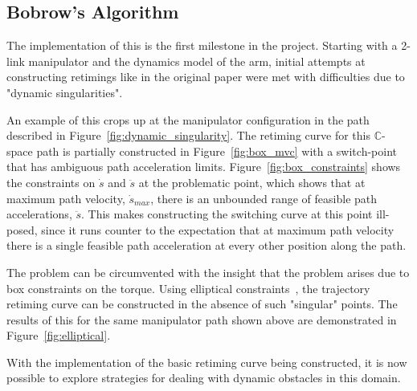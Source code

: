 \documentclass[letterpaper,11pt]{article} %
\newcommand{\ffig}[3]{
\begin{figure}[h!]
\centering
\texttt{[image: \#1]}
\caption{#2}
\label{fig:#3}
\end{figure}
}
\newif\ifpfig
\begin{document}
\subsection{Bobrow's Algorithm}\label{subsec:bobrow}

The implementation of this is the first milestone in the project. Starting with a 2-link manipulator and the dynamics model of the arm, initial attempts at constructing retimings like in the original paper were met with difficulties due to "dynamic singularities".

\ifpfig
\ffig{pics/box_constraint_mvc}{Maximum Velocity curve in the $s$-$\dot{s}$ plane, with the $\beta$ and $\alpha$ acceleration profiles from start and end configurations.}{box_mvc}
\ffig{pics/bobrow_path}{Demonstration of successful trajectory retiming curve constructed using elliptical torque contraints.}{elliptical}
\ffig{pics/box_constraints_at_switch}{Constraints on $\dot{s}$ and $\ddot{s}$ at the irregular switch point. The exaggerated scale of the $\ddot{s}$ means a practically unbounded range of path accelerations can be chosen at the point of maximum path velocity $\dot{s}_{max}$}{box_constraints}
\fi

An example of this crops up at the manipulator configuration in the path described in Figure~\ref{fig:dynamic_singularity}. The retiming curve for this $\mathbb{C}$-space path is partially constructed in Figure~\ref{fig:box_mvc} with a switch-point that has ambiguous path acceleration limits. Figure~\ref{fig:box_constraints} shows the constraints on $\dot{s}$ and $\ddot{s}$ at the problematic point, which shows that at maximum path velocity, $\dot{s}_{max}$, there is an unbounded range of feasible path accelerations, $\ddot{s}$. This makes constructing the switching curve at this point ill-posed, since it runs counter to the expectation that at maximum path velocity there is a single feasible path acceleration at every other position along the path.

The problem can be circumvented with the insight that the problem arises due to box constraints on the torque. Using elliptical constraints~\cite{shiller1992computation}, the trajectory retiming curve can be constructed in the absence of such "singular" points. The results of this for the same manipulator path shown above are demonstrated in Figure~\ref{fig:elliptical}.

With the implementation of the basic retiming curve being constructed, it is now possible to explore strategies for dealing with dynamic obstacles in this domain.
\end{document}
